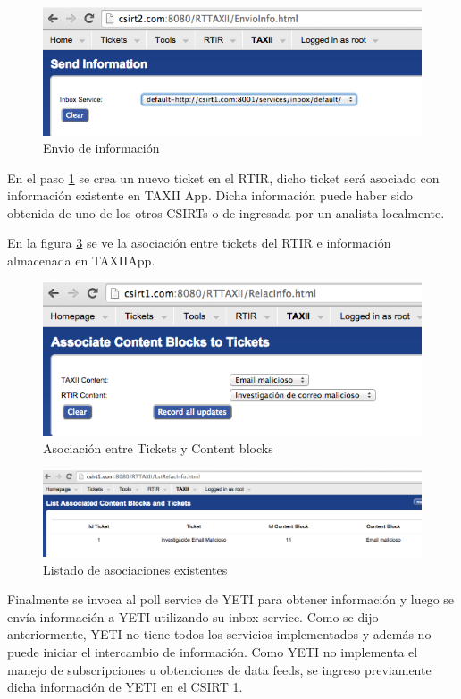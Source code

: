 \begin{figure}[h!]
	\centering
	\includegraphics[scale=0.4]{caso-de-estudio/envioInfo.png}
	\caption{Envio de información}
	\label{fig.envioInfo}
\end{figure}

En el paso \ref{fig.envioInfo} se crea un nuevo ticket en el RTIR, dicho ticket será asociado con información existente en TAXII App. Dicha información puede haber sido obtenida de uno de los otros CSIRTs o de ingresada por un analista localmente.

En la figura \ref{fig.lstRelacInfo} se ve la asociación entre tickets del RTIR e información almacenada en TAXIIApp.

\begin{figure}[h!]
	\centering
	\includegraphics[scale=0.4]{caso-de-estudio/relacInfo.png}
	\caption{Asociación entre Tickets y Content blocks}
	\label{fig.relacInfo}
\end{figure}

\begin{figure}[h!]
	\centering
	\includegraphics[scale=0.4]{caso-de-estudio/lstRelacInfo.png}
	\caption{Listado de asociaciones existentes}
	\label{fig.lstRelacInfo}
\end{figure}

Finalmente se invoca al poll service de YETI para obtener información y luego se envía información a YETI utilizando su inbox service. Como se dijo anteriormente, YETI no tiene todos los servicios implementados y además no puede iniciar el intercambio de información. Como YETI  no implementa el manejo de subscripciones u obtenciones de data feeds, se ingreso previamente dicha información de YETI en el CSIRT 1.